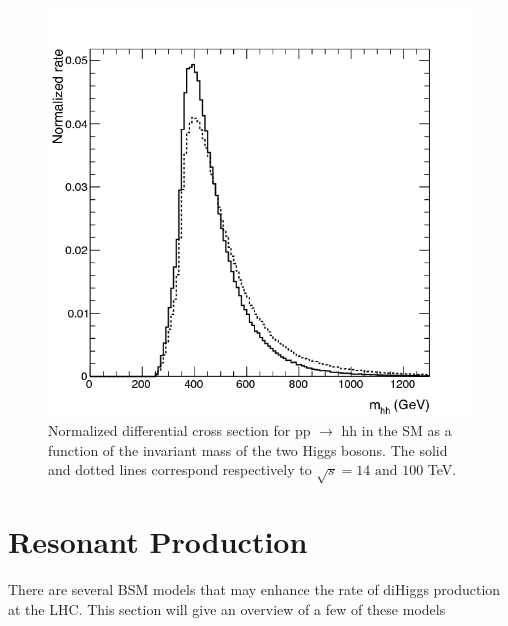 \begin{figure}[h]
\begin{center}
\includegraphics[scale=0.3]{figures/SM_continuum}
\caption[Normalized di-Higgs cross section]{Normalized differential cross section for pp ${\rightarrow}$ hh in the SM as a function of the invariant mass of the two Higgs bosons. The solid and dotted lines correspond respectively to ${\sqrt{s} = 14 \textrm{ and } 100}$ TeV.\cite{azatov:2015}}
\label{fig:SM_cont}
\end{center}
\end{figure}


\section{Resonant Production}
There are several BSM models that may enhance the rate of diHiggs production at the LHC. This section will give an overview of a few of these models
